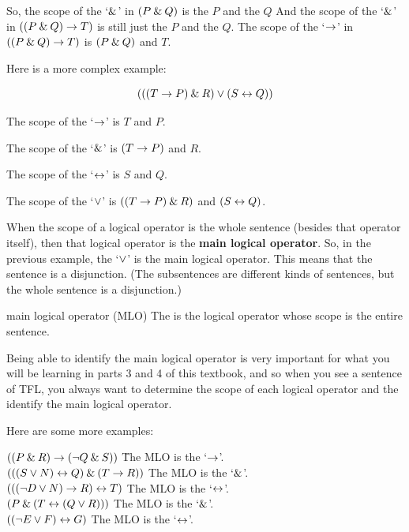 So, the scope of the `$\mathbin{\&}$' in $(P \mathbin{\&} Q)$ is the $P$ and the $Q$ And the scope of the `$\mathbin{\&}$' in $((P \mathbin{\&} Q) \rightarrow T)$ is still just the $P$ and the $Q$. The scope of the `$\rightarrow$' in $((P \mathbin{\&} Q) \rightarrow T)$ is $(P \mathbin{\&} Q)$ and $T$.

Here is a more complex example:

$$(((T \rightarrow P) \mathbin{\&} R) \vee (S \leftrightarrow Q))$$

\begin{ebullet}
	\item[] The scope of the `$\rightarrow$' is $T$ and $P$. 
	\item[] The scope of the `$\mathbin{\&}$' is $(T \rightarrow P)$ and $R$.
	\item[] The scope of the `$\leftrightarrow$' is $S$ and $Q$.
	\item[] The scope of the `$\vee$' is $((T \rightarrow P) \mathbin{\&} R)$ and $(S \leftrightarrow Q)$.
\end{ebullet}

When the scope of a logical operator is the whole sentence (besides that operator itself), then that logical operator is the \textbf{main logical operator}. So, in the previous example, the `$\vee$' is the main logical operator. This means that the sentence is a disjunction. (The subsentences are different kinds of sentences, but the whole sentence is a disjunction.)

\begin{factboxy}{main logical operator (MLO)}
The  is the logical operator whose scope is the entire sentence. 
\end{factboxy}

Being able to identify the main logical operator is very important for what you will be learning in parts 3 and 4 of this textbook, and so when you see a sentence of TFL, you always want to determine the scope of each logical operator and the identify the main logical operator. 

Here are some more examples:
\begin{tabbing}
\quad$((P \mathbin{\&} R) \rightarrow ({\neg} Q \mathbin{\&} S))$ \qquad \qquad \qquad \= The MLO is the `$\rightarrow$'.\\\smallskip 
\quad$(((S \vee N) \leftrightarrow Q) \mathbin{\&} (T \rightarrow R))$ \> The MLO is the `$\mathbin{\&}$'.\\\smallskip
\quad$((({\neg} D \vee N) \rightarrow R) \leftrightarrow T)$ \> The MLO is the `$\leftrightarrow$'.\\\smallskip
\quad$(P \mathbin{\&} (T \leftrightarrow (Q \vee R)))$ \> The MLO is the `$\mathbin{\&}$'.\\\smallskip
\quad$(({\neg} E \vee F) \leftrightarrow G)$ \> The MLO is the `$\leftrightarrow$'.
\end{tabbing}


